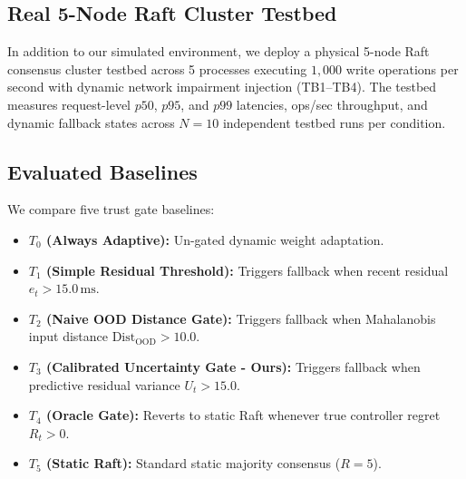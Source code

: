 \subsection{Real 5-Node Raft Cluster Testbed}
In addition to our simulated environment, we deploy a physical 5-node Raft consensus cluster testbed across 5 processes executing $1,000$ write operations per second with dynamic network impairment injection (TB1--TB4). The testbed measures request-level $p50$, $p95$, and $p99$ latencies, ops/sec throughput, and dynamic fallback states across $N=10$ independent testbed runs per condition.

\subsection{Evaluated Baselines}
We compare five trust gate baselines:
\begin{itemize}
    \item \textbf{$T_0$ (Always Adaptive):} Un-gated dynamic weight adaptation.
    \item \textbf{$T_1$ (Simple Residual Threshold):} Triggers fallback when recent residual $e_t > 15.0\,\text{ms}$.
    \item \textbf{$T_2$ (Naive OOD Distance Gate):} Triggers fallback when Mahalanobis input distance $\text{Dist}_{\text{OOD}} > 10.0$.
    \item \textbf{$T_3$ (Calibrated Uncertainty Gate - Ours):} Triggers fallback when predictive residual variance $U_t > 15.0$.
    \item \textbf{$T_4$ (Oracle Gate):} Reverts to static Raft whenever true controller regret $R_t > 0$.
    \item \textbf{$T_5$ (Static Raft):} Standard static majority consensus ($R=5$).
\end{itemize}
